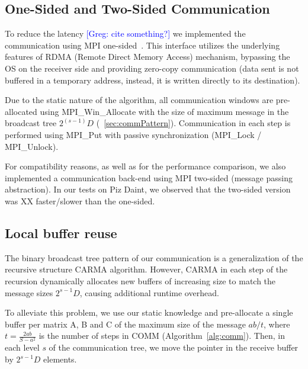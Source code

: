 \documentclass[sigplan,review,anonymous]{acmart}\settopmatter{printfolios=true,printccs=false,printacmref=false}
\newcommand\greg[1]{\textcolor{blue}{[Greg: #1]}}
\begin{document}
\subsection{One-Sided and Two-Sided Communication}
\label{sec:rdma}
To reduce the latency \greg{cite something?} we implemented the communication 
using MPI one-sided~\cite{mpi3-rma-overview}. This interface utilizes the 
underlying features of RDMA (Remote Direct Memory Access) mechanism, bypassing 
the OS on the receiver side and providing zero-copy communication (data sent is 
not buffered in a temporary address, instead, it is written directly to its 
destination).

Due to the static nature of the algorithm, all communication windows are 
pre-allocated using MPI\_Win\_Allocate with the size of maximum message in the 
broadcast tree $2^(s-1) D$ (~\cref{sec:commPattern}). Communication in each 
step is performed using MPI\_Put with passive synchronization (MPI\_Lock / 
MPI\_Unlock).

For compatibility reasons, as well as for the performance comparison, we also 
implemented a communication back-end using MPI two-sided (message passing 
abstraction). In our tests on Piz Daint, we observed that the two-sided version 
was XX faster/slower than the one-sided.


\subsection{Local buffer reuse}
\label{sec:bufferReuse}
The binary broadcast tree pattern of our communication is a generalization of 
the recursive structure CARMA algorithm. However, CARMA in each step of the 
recursion dynamically allocates new buffers of increasing size to match the 
message sizes $2^{s-1} D$, causing additional runtime overhead.

To alleviate this problem, we use our static knowledge and pre-allocate a 
single buffer per matrix A, B and C of the maximum size of the message $ab/t$, 
where $t = \frac{2ab}{S - a^2}$ is the number of steps in COMM 
(Algorithm~\ref{alg:comm}). Then, in each level $s$ of the communication tree, 
we  move the pointer in the receive buffer by $2^{s-1} D$ elements.
\end{document}
